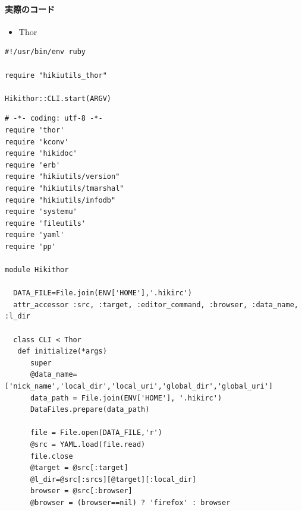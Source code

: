 \paragraph{実際のコード}
\begin{itemize}
\item Thor
\end{itemize}\begin{lstlisting}[style=customRuby]
#!/usr/bin/env ruby                                                             

require "hikiutils_thor"

Hikithor::CLI.start(ARGV)
\end{lstlisting}\begin{lstlisting}[style=customRuby]
# -*- coding: utf-8 -*-                                                         
require 'thor'
require 'kconv'
require 'hikidoc'
require 'erb'
require "hikiutils/version"
require "hikiutils/tmarshal"
require "hikiutils/infodb"
require 'systemu'
require 'fileutils'
require 'yaml'
require 'pp'

module Hikithor

  DATA_FILE=File.join(ENV['HOME'],'.hikirc')
  attr_accessor :src, :target, :editor_command, :browser, :data_name, :l_dir

  class CLI < Thor
   def initialize(*args)
      super
      @data_name=['nick_name','local_dir','local_uri','global_dir','global_uri']
      data_path = File.join(ENV['HOME'], '.hikirc')
      DataFiles.prepare(data_path)

      file = File.open(DATA_FILE,'r')
      @src = YAML.load(file.read)
      file.close
      @target = @src[:target]
      @l_dir=@src[:srcs][@target][:local_dir]
      browser = @src[:browser]
      @browser = (browser==nil) ? 'firefox' : browser

\end{lstlisting}

